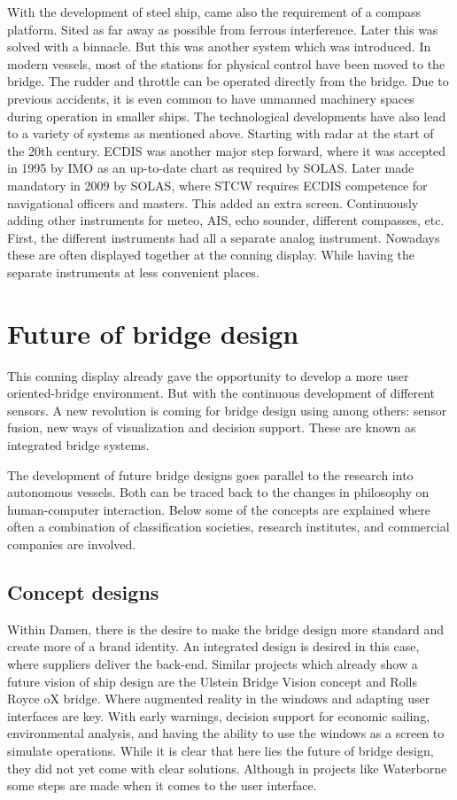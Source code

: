 With the development of steel ship, came also the requirement of a compass platform. Sited as far away as possible from ferrous interference. Later this was solved with a binnacle. But this was another system which was introduced. In modern vessels, most of the stations for physical control have been moved to the bridge. The rudder and throttle can be operated directly from the bridge. Due to previous accidents, it is even common to have unmanned machinery spaces during operation in smaller ships. The technological developments have also lead to a variety of systems as mentioned above. Starting with radar at the start of the 20th century. \ac{ECDIS} was another major step forward, where it was accepted in 1995 by IMO as an up-to-date chart as required by \ac{SOLAS}. Later made mandatory in 2009 by \ac{SOLAS}, where \ac{STCW} requires \ac{ECDIS} competence for navigational officers and masters. This added an extra screen. Continuously adding other instruments for meteo, \ac{AIS}, echo sounder, different compasses, etc. First, the different instruments had all a separate analog instrument. Nowadays these are often displayed together at the conning display. While having the separate instruments at less convenient places.

\section{Future of bridge design}
This conning display already gave the opportunity to develop a more user oriented-bridge environment. But with the continuous development of different sensors. A new revolution is coming for bridge design using among others: sensor fusion, new ways of visualization and decision support. These are known as integrated bridge systems.

The development of future bridge designs goes parallel to the research into autonomous vessels. Both can be traced back to the changes in philosophy on human-computer interaction. Below some of the concepts are explained where often a combination of classification societies, research institutes, and commercial companies are involved.

\subsection{Concept designs}
Within Damen, there is the desire to make the bridge design more standard and create more of a brand identity. An integrated design is desired in this case, where suppliers deliver the back-end. Similar projects which already show a future vision of ship design are the Ulstein Bridge Vision concept and Rolls Royce oX bridge. Where augmented reality in the windows and adapting user interfaces are key. With early warnings, decision support for economic sailing, environmental analysis, and having the ability to use the windows as a screen to simulate operations. While it is clear that here lies the future of bridge design, they did not yet come with clear solutions. Although in projects like Waterborne some steps are made when it comes to the user interface.\cite{RollsRoyce2015} \cite{Ulstein2013}

